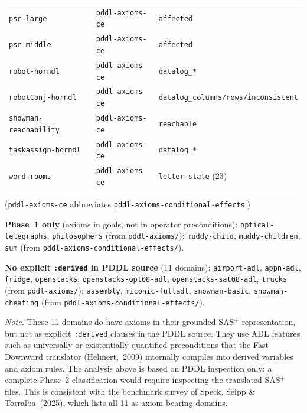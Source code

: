 \documentclass[11pt,a4paper]{article}
\begin{document}
\begin{itemize}
\begin{center}
\begin{tabular}{lll}
    \texttt{psr-large}            & \texttt{pddl-axioms-ce} & \texttt{affected} \\
    \texttt{psr-middle}           & \texttt{pddl-axioms-ce} & \texttt{affected} \\
    \texttt{robot-horndl}         & \texttt{pddl-axioms-ce} & \texttt{datalog\_*} \\
    \texttt{robotConj-horndl}     & \texttt{pddl-axioms-ce} & \texttt{datalog\_columns/rows/inconsistent} \\
    \texttt{snowman-reachability} & \texttt{pddl-axioms-ce} & \texttt{reachable} \\
    \texttt{taskassign-horndl}    & \texttt{pddl-axioms-ce} & \texttt{datalog\_*} \\
    \texttt{word-rooms}           & \texttt{pddl-axioms-ce} & \texttt{letter-state} (23) \\
    \bottomrule
    \end{tabular}
    \end{center}

    \noindent(\texttt{pddl-axioms-ce} abbreviates \texttt{pddl-axioms-conditional-effects}.)

    \medskip
    \noindent\textbf{Phase~1 only} (axioms in goals, not in operator preconditions):
    \texttt{optical-telegraphs}, \texttt{philosophers} (from \texttt{pddl-axioms/});
    \texttt{muddy-child}, \texttt{muddy-children}, \texttt{sum} (from
    \texttt{pddl-axioms-conditional-effects/}).

    \medskip
    \noindent\textbf{No explicit \texttt{:derived} in PDDL source} (11 domains):
    \texttt{airport-adl}, \texttt{appn-adl}, \texttt{fridge}, \texttt{openstacks},
    \texttt{openstacks-opt08-adl}, \texttt{openstacks-sat08-adl}, \texttt{trucks}
    (from \texttt{pddl-axioms/});
    \texttt{assembly}, \texttt{miconic-fulladl}, \texttt{snowman-basic},
    \texttt{snowman-cheating} (from \texttt{pddl-axioms-conditional-effects/}).

    \smallskip
    \noindent\textit{Note.}  These 11 domains do have axioms in their grounded
    SAS$^+$ representation, but not as explicit \texttt{:derived} clauses in the
    PDDL source.  They use ADL features such as universally or existentially
    quantified preconditions that the Fast Downward translator
    (Helmert,~2009) internally compiles into derived variables and axiom rules.
    The analysis above is based on PDDL inspection only; a complete Phase~2
    classification would require inspecting the translated SAS$^+$ files.
    This is consistent with the benchmark survey of Speck, Seipp \&
    Torralba~(2025), which lists all 11 as axiom-bearing domains.


\end{itemize}
\end{document}
